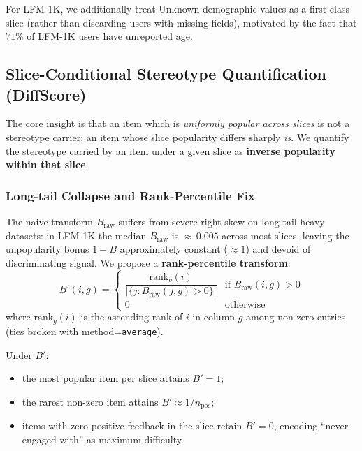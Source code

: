 For LFM-1K, we additionally treat \textsf{Unknown} demographic values as a first-class slice (rather than discarding users with missing fields), motivated by the fact that $71\%$ of LFM-1K users have unreported age.

\subsection{Slice-Conditional Stereotype Quantification (DiffScore)}
\label{subsec:diffscore}

The core insight is that an item which is \emph{uniformly popular across slices} is not a stereotype carrier; an item whose slice popularity differs sharply \emph{is}. We quantify the stereotype carried by an item under a given slice as \textbf{inverse popularity within that slice}.

\subsubsection{Long-tail Collapse and Rank-Percentile Fix}

The naive transform $B_{\text{raw}}$ suffers from severe right-skew on long-tail-heavy datasets: in LFM-1K the median $B_{\text{raw}}$ is ${\approx}\,0.005$ across most slices, leaving the unpopularity bonus $1 - B$ approximately constant ($\approx 1$) and devoid of discriminating signal. We propose a \textbf{rank-percentile transform}:
\begin{equation}
B'(i, g) = 
\begin{cases}
\dfrac{\text{rank}_g(i)}{|\{j : B_{\text{raw}}(j, g) > 0\}|} & \text{if } B_{\text{raw}}(i, g) > 0 \\[6pt]
0 & \text{otherwise}
\end{cases}
\label{eq:rank-percentile}
\end{equation}
where $\text{rank}_g(i)$ is the ascending rank of $i$ in column $g$ among non-zero entries (ties broken with method=\texttt{average}).

Under $B'$:
\begin{itemize}
\item the most popular item per slice attains $B' = 1$;
\item the rarest non-zero item attains $B' \approx 1/n_{\text{pos}}$;
\item items with zero positive feedback in the slice retain $B' = 0$, encoding ``never engaged with'' as maximum-difficulty.
\end{itemize}


